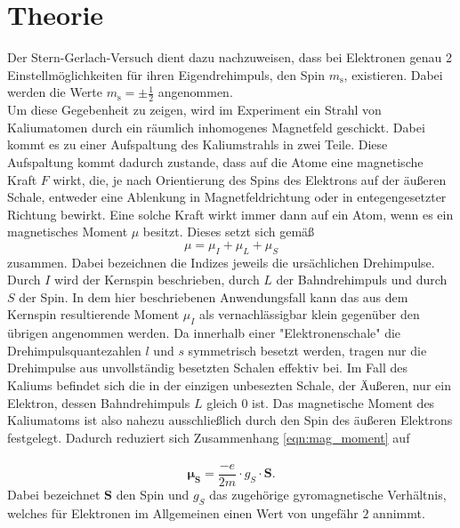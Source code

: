 \section{Theorie}
\label{sec:Theorie}
Der Stern-Gerlach-Versuch dient dazu nachzuweisen,
dass bei Elektronen genau 2 Einstellmöglichkeiten für ihren
Eigendrehimpuls, den Spin $ m_\text{s} $, existieren.
Dabei werden die Werte $ m_\text{s} = \pm \frac{1}{2} $
angenommen.\\ Um diese Gegebenheit zu zeigen, wird im Experiment ein
Strahl von Kaliumatomen durch ein räumlich inhomogenes Magnetfeld
geschickt. Dabei kommt es zu einer Aufspaltung des Kaliumstrahls
in zwei Teile. Diese Aufspaltung kommt dadurch zustande, dass auf die
Atome eine magnetische Kraft $F$ wirkt, die, je nach Orientierung des
Spins des Elektrons auf der äußeren Schale, entweder eine Ablenkung in
Magnetfeldrichtung oder in entegengesetzter Richtung bewirkt.
Eine solche Kraft wirkt immer dann auf ein Atom, wenn es ein magnetisches
Moment $\mu$ besitzt. Dieses setzt sich gemäß
\begin{equation}
  \label{eqn:mag_moment}
  \mu = \mu_{I} + \mu_{L} + \mu_{S}
\end{equation}
zusammen. Dabei bezeichnen die Indizes jeweils die ursächlichen
Drehimpulse. Durch $I$ wird der Kernspin beschrieben, durch $L$ der
Bahndrehimpuls und durch $S$ der Spin. In dem hier beschriebenen
Anwendungsfall kann das aus dem Kernspin resultierende Moment $\mu_{I}$
als vernachlässigbar klein gegenüber den übrigen angenommen werden.
Da innerhalb einer "Elektronenschale" die Drehimpulsquantezahlen $l$
und $s$ symmetrisch besetzt werden, tragen nur die Drehimpulse aus
unvollständig besetzten Schalen effektiv bei. Im Fall des Kaliums
befindet sich die in der einzigen unbesezten Schale, der Äußeren, nur
ein Elektron, dessen Bahndrehimpuls $L$ gleich $0$ ist. Das magnetische
Moment des Kaliumatoms ist also nahezu ausschließlich
durch den Spin des äußeren Elektrons festgelegt. Dadurch reduziert sich
Zusammenhang \eqref{eqn:mag_moment} auf \\ \\
\begin{equation}
  \label{eqn:spin_moment}
  \symbf{\mu_{S}} = \frac{-e}{2 m} \cdot g_{S} \cdot \symbf{S}.
\end{equation}
Dabei bezeichnet $\symbf{S}$ den Spin und $g_{S}$ das zugehörige
gyromagnetische Verhältnis, welches für Elektronen im Allgemeinen
einen Wert von ungefähr $2$ annimmt.\\ \\
